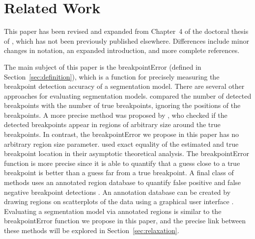 \documentclass{article}
\begin{document}
\newpage

\section{Related Work}

This paper has been revised and expanded from Chapter~4 of the
doctoral thesis of \citet{HOCKING-phd-ch4}, which has not been
previously published elsewhere. Differences include minor changes
in notation, an expanded introduction, and more complete references.

The main subject of this paper is the breakpointError (defined in
Section~\ref{sec:definition}), which is a function for precisely
measuring the breakpoint detection accuracy of a segmentation
model. There are several other approaches for evaluating segmentation
models. \citet{zaid-lasso} compared the number of detected breakpoints
with the number of true breakpoints, ignoring the positions of the
breakpoints. A more precise method was proposed by
\citet{perf-eval-framework}, who checked if the detected breakpoints
appear in regions of arbitrary size around the true breakpoints. In
contrast, the breakpointError we propose in this paper has no
arbitrary region size parameter. \citet{group-fused} used exact
equality of the estimated and true breakpoint location in their
asymptotic theoretical analysis. The breakpointError function is more
precise since it is able to quantify that a guess close to a true
breakpoint is better than a guess far from a true breakpoint. A final
class of methods uses an annotated region database to quantify false
positive and false negative breakpoint detections
\citep{HOCKING-breakpoints, HOCKING-penalties}. An annotation database
can be created by drawing regions on scatterplots of the data using a
graphical user interface \citep{SegAnnDB}. Evaluating a segmentation
model via annotated regions is similar to the breakpointError function
we propose in this paper, and the precise link between these methods
will be explored in Section~\ref{sec:relaxation}.
\end{document}

